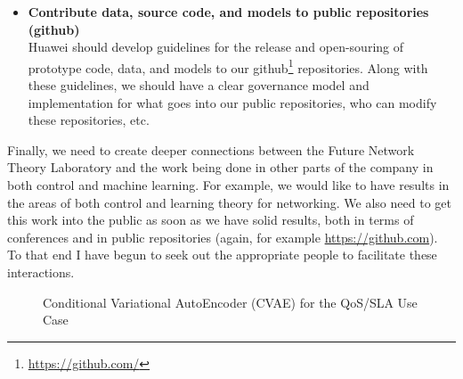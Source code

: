 \documentclass[11pt, oneside]{article}   	%
\begin{document}
\begin{itemize}
\item \textbf{Contribute data, source code, and models to public repositories (github)} \\
Huawei should develop guidelines for the release and open-souring of prototype code, data, and models to our github\footnote{\url{https://github.com/}} repositories. 
Along with these guidelines, we should have a clear governance model and implementation for what goes into our
public repositories, who can modify these repositories, etc.
\end{itemize}

\bigskip
\noindent
Finally, we need to create deeper connections between the Future Network Theory Laboratory and the work being done in other 
parts of the company in both control and machine learning. For example, we would like to have results in the areas of both control
and learning theory for networking. We also need to get this work into the public as soon
as we have solid results, both in terms of conferences and in public repositories (again, for example \url{https://github.com}).  
To that end I have begun to seek out the appropriate people to facilitate these interactions.

\begin{figure}[b]
\caption{Conditional Variational AutoEncoder (CVAE) for the QoS/SLA Use Case}
\label{fig:cvae}
\end{figure}

\newpage


\end{document}
